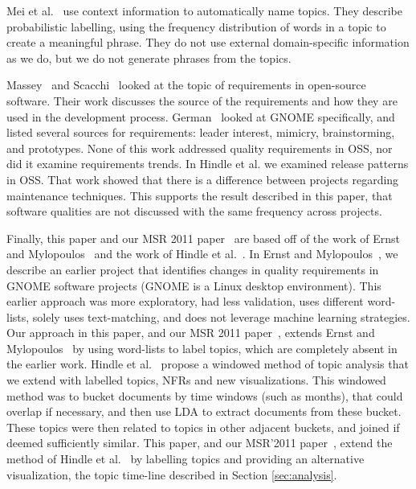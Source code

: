 \documentclass[smallextended]{svjour3}       %
\begin{document}
Mei et al.~\cite{Mei2007} use context information to automatically name topics. 
They describe probabilistic labelling, using the frequency distribution of words in a topic to create a meaningful phrase. 
They do not use external domain-specific information as we do, but we
do not generate phrases from the topics.


Massey~\cite{massey02icse} and Scacchi~\cite{scacchi05b} looked at the topic of requirements in open-source software. 
Their work discusses the source of the requirements and how they are used in the development process. 
 German~\cite{german03gnome} looked at GNOME specifically, and listed several sources for requirements: leader interest, mimicry, brainstorming, and prototypes. 
None of this work  addressed quality requirements in OSS, nor did it examine requirements trends.
In Hindle et al. \cite{Hindle2007} we examined release patterns in OSS. That work showed that there is a difference between projects regarding maintenance
techniques. This supports the result described in this paper, that software qualities are not discussed with the same frequency across projects.



Finally, 
this paper and our MSR 2011 paper~\cite{msr2011} are based off of the
work of Ernst and Mylopoulos~\cite{ernst10refsq} and the work of Hindle et
al.~\cite{Hindle09ICSM}.
In Ernst and Mylopoulos~\cite{ernst10refsq}, we describe an earlier
project that identifies changes in quality requirements
in GNOME software projects (GNOME is a Linux desktop environment). This earlier approach was more exploratory, had
less validation, uses different word-lists, solely uses text-matching,
and does not leverage machine learning strategies.  
Our approach in this paper, and our
MSR 2011 paper~\cite{msr2011}, extends Ernst and Mylopoulos~\cite{ernst10refsq} by using 
word-lists to label topics, which are completely absent in the earlier work.
 Hindle et
al.~\cite{Hindle09ICSM}
 propose a windowed method of topic
analysis that we extend with labelled
topics, NFRs and new visualizations. This windowed method was
to bucket documents  by time windows (such as months), that could overlap if
necessary, and then use LDA to extract documents from these
bucket. These topics were then related to topics in other adjacent
buckets, and joined if deemed sufficiently similar. This paper, and our
MSR'2011 paper~\cite{msr2011}, extend the method of Hindle et
al.~\cite{Hindle09ICSM} by labelling topics
and providing an alternative visualization, the topic time-line
described in Section \ref{sec:analysis}.
\end{document}
